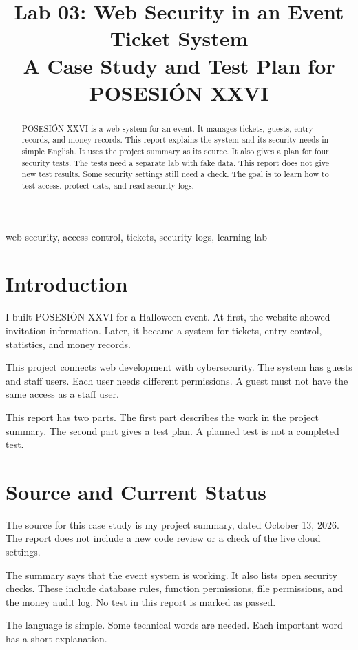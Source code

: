\documentclass[conference]{IEEEtran}
\title{Lab 03: Web Security in an Event Ticket System\\A Case Study and Test Plan for POSESI\'ON XXVI}
\author{\IEEEauthorblockN{Miguel \'Angel Coria Vargas}
\IEEEauthorblockA{Cybersecurity Engineering Student\\
Universidad Polit\'ecnica de Yucat\'an\\
M\'erida, Mexico}}
\begin{document}
\maketitle

\begin{abstract}
POSESI\'ON XXVI is a web system for an event. It manages tickets, guests, entry records, and money records. This report explains the system and its security needs in simple English. It uses the project summary as its source. It also gives a plan for four security tests. The tests need a separate lab with fake data. This report does not give new test results. Some security settings still need a check. The goal is to learn how to test access, protect data, and read security logs.
\end{abstract}

\begin{IEEEkeywords}
web security, access control, tickets, security logs, learning lab
\end{IEEEkeywords}

\section{Introduction}
I built POSESI\'ON XXVI for a Halloween event. At first, the website showed invitation information. Later, it became a system for tickets, entry control, statistics, and money records.

This project connects web development with cybersecurity. The system has guests and staff users. Each user needs different permissions. A guest must not have the same access as a staff user.

This report has two parts. The first part describes the work in the project summary. The second part gives a test plan. A planned test is not a completed test.

\section{Source and Current Status}
The source for this case study is my project summary, dated October 13, 2026. The report does not include a new code review or a check of the live cloud settings.

The summary says that the event system is working. It also lists open security checks. These include database rules, function permissions, file permissions, and the money audit log. No test in this report is marked as passed.

The language is simple. Some technical words are needed. Each important word has a short explanation.
\end{document}
